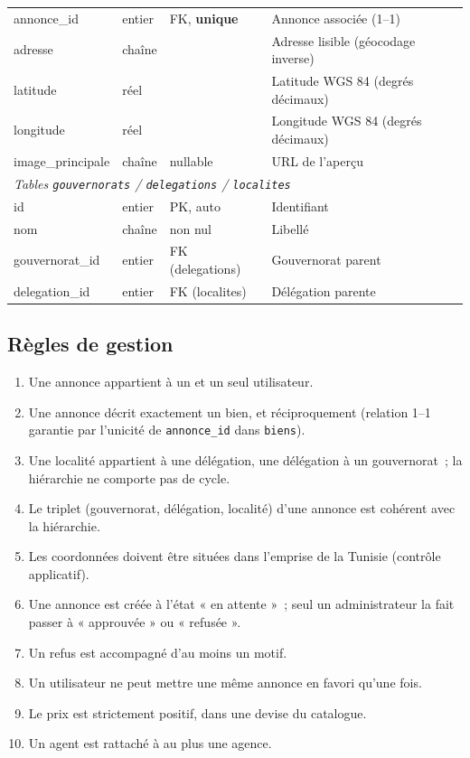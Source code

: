 \begin{longtable}{p{2.8cm} p{2.5cm} p{2cm} p{5.4cm}}
annonce\_id   & entier        & FK, \textbf{unique} & Annonce associée (1--1) \\
adresse       & chaîne        &                & Adresse lisible (géocodage inverse) \\
latitude      & réel          &                & Latitude WGS 84 (degrés décimaux) \\
longitude     & réel          &                & Longitude WGS 84 (degrés décimaux) \\
image\_principale & chaîne    & nullable       & URL de l'aperçu \\
\midrule
\multicolumn{4}{l}{\textit{Tables \texttt{gouvernorats} / \texttt{delegations} / \texttt{localites}}}\\
id            & entier        & PK, auto       & Identifiant \\
nom           & chaîne        & non nul        & Libellé \\
gouvernorat\_id & entier      & FK (delegations) & Gouvernorat parent \\
delegation\_id & entier       & FK (localites)  & Délégation parente \\
\bottomrule
\end{longtable}

\subsection{Règles de gestion}
\begin{enumerate}[label=RG-\arabic*.,itemsep=1pt]
  \item Une annonce appartient à un et un seul utilisateur.
  \item Une annonce décrit exactement un bien, et réciproquement (relation 1--1
        garantie par l'unicité de \texttt{annonce\_id} dans \texttt{biens}).
  \item Une localité appartient à une délégation, une délégation à un
        gouvernorat~; la hiérarchie ne comporte pas de cycle.
  \item Le triplet (gouvernorat, délégation, localité) d'une annonce est
        cohérent avec la hiérarchie.
  \item Les coordonnées doivent être situées dans l'emprise de la Tunisie
        (contrôle applicatif).
  \item Une annonce est créée à l'état « en attente »~; seul un administrateur
        la fait passer à « approuvée » ou « refusée ».
  \item Un refus est accompagné d'au moins un motif.
  \item Un utilisateur ne peut mettre une même annonce en favori qu'une fois.
  \item Le prix est strictement positif, dans une devise du catalogue.
  \item Un agent est rattaché à au plus une agence.
\end{enumerate}

